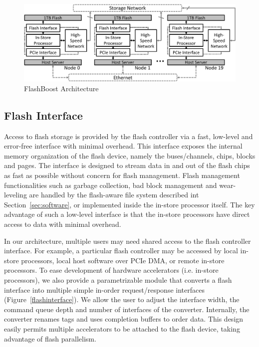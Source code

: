 \begin{figure}[ht]
	\begin{center}
	\includegraphics[width=0.8\paperwidth]{figures/architecture.pdf}
	\caption{FlashBoost Architecture}
	\label{fig:architecture}
	\end{center}
\end{figure}

\subsection{Flash Interface}

Access to flash storage is provided by the flash controller via a fast,
low-level and error-free interface with minimal overhead. This interface exposes
the internal memory organization of the flash device, namely the buses/channels,
chips, blocks and pages.  The interface is designed to stream data in and out of
the flash chips as fast as possible without concern for flash management. Flash
management functionalities such as garbage collection, bad block management and
wear-leveling are handled by the flash-aware file system described int
Section~\ref{sec:software}, or implemented inside the in-store processor itself.
The key advantage of such a low-level interface is that the in-store processors
have direct access to data with minimal overhead.

In our architecture, multiple users may need shared access to the
flash controller interface. For example, a particular flash controller may
be accessed by local in-store processors, local host software over PCIe
DMA, or remote in-store processors. 
To ease development of hardware accelerators (i.e. in-store processors),
we also provide a parametrizable module that converts a flash interface
into multiple simple in-order request/response interfaces
(Figure~\ref{flashinterface}). We allow the user to adjust the interface width, the
command queue depth and number of interfaces of the converter.
Internally, the converter renames tags and uses completion buffers to
order data. This design easily permits multiple accelerators to be
attached to the flash device, taking advantage of flash parallelism. 


